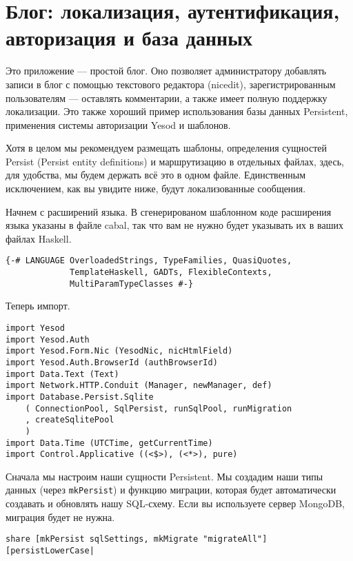 \chapter{Блог: локализация, аутентификация, авторизация и база данных}
\label{chap:blog}

Это приложение --- простой блог. Оно позволяет администратору добавлять записи в блог с помощью текстового редактора (nicedit), зарегистрированным пользователям --- оставлять комментарии, а также имеет полную поддержку локализации. Это также хороший пример использования базы данных Persistent, применения системы авторизации Yesod и шаблонов.

Хотя в целом мы рекомендуем размещать шаблоны, определения сущностей Persist (Persist entity definitions) и маршрутизацию в отдельных файлах, здесь, для удобства, мы будем держать всё это в одном файле. Единственным исключением, как вы увидите ниже, будут локализованные сообщения.

Начнем с расширений языка. В сгенерированом шаблонном коде расширения языка указаны в файле cabal, так что вам не нужно будет указывать их в ваших файлах Haskell.
 
\begin{lstlisting}
{-# LANGUAGE OverloadedStrings, TypeFamilies, QuasiQuotes,
             TemplateHaskell, GADTs, FlexibleContexts,
             MultiParamTypeClasses #-}
\end{lstlisting}
 
Теперь импорт. 

\begin{lstlisting} 
import Yesod
import Yesod.Auth
import Yesod.Form.Nic (YesodNic, nicHtmlField)
import Yesod.Auth.BrowserId (authBrowserId)
import Data.Text (Text)
import Network.HTTP.Conduit (Manager, newManager, def)
import Database.Persist.Sqlite
    ( ConnectionPool, SqlPersist, runSqlPool, runMigration
    , createSqlitePool
    )
import Data.Time (UTCTime, getCurrentTime)
import Control.Applicative ((<$>), (<*>), pure)
\end{lstlisting}%

Сначала мы настроим наши сущности Persistent. Мы создадим наши типы данных (через \lstinline!mkPersist!) и функцию миграции, которая будет автоматически создавать и обновлять нашу SQL-схему. Если вы используете сервер MongoDB, миграция будет не нужна.

\begin{lstlisting}
share [mkPersist sqlSettings, mkMigrate "migrateAll"] [persistLowerCase|
\end{lstlisting}
 
